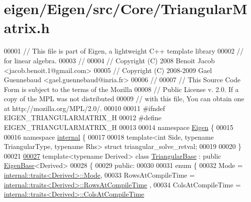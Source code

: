 \hypertarget{eigen_2_eigen_2src_2_core_2_triangular_matrix_8h_source}{}\section{eigen/\+Eigen/src/\+Core/\+Triangular\+Matrix.h}
\label{eigen_2_eigen_2src_2_core_2_triangular_matrix_8h_source}

\begin{DoxyCode}
00001 \textcolor{comment}{// This file is part of Eigen, a lightweight C++ template library}
00002 \textcolor{comment}{// for linear algebra.}
00003 \textcolor{comment}{//}
00004 \textcolor{comment}{// Copyright (C) 2008 Benoit Jacob <jacob.benoit.1@gmail.com>}
00005 \textcolor{comment}{// Copyright (C) 2008-2009 Gael Guennebaud <gael.guennebaud@inria.fr>}
00006 \textcolor{comment}{//}
00007 \textcolor{comment}{// This Source Code Form is subject to the terms of the Mozilla}
00008 \textcolor{comment}{// Public License v. 2.0. If a copy of the MPL was not distributed}
00009 \textcolor{comment}{// with this file, You can obtain one at http://mozilla.org/MPL/2.0/.}
00010 
00011 \textcolor{preprocessor}{#ifndef EIGEN\_TRIANGULARMATRIX\_H}
00012 \textcolor{preprocessor}{#define EIGEN\_TRIANGULARMATRIX\_H}
00013 
00014 \textcolor{keyword}{namespace }\hyperlink{namespace_eigen}{Eigen} \{ 
00015 
00016 \textcolor{keyword}{namespace }\hyperlink{namespaceinternal}{internal} \{
00017   
00018 \textcolor{keyword}{template}<\textcolor{keywordtype}{int} S\textcolor{keywordtype}{id}e, \textcolor{keyword}{typename} TriangularType, \textcolor{keyword}{typename} Rhs> \textcolor{keyword}{struct }triangular\_solve\_retval;
00019   
00020 \}
00021 
\hyperlink{group___core___module}{00027} \textcolor{keyword}{template}<\textcolor{keyword}{typename} Derived> \textcolor{keyword}{class }\hyperlink{group___core___module_class_eigen_1_1_triangular_base}{TriangularBase} : \textcolor{keyword}{public} \hyperlink{group___core___module_struct_eigen_1_1_eigen_base}{EigenBase}<Derived>
00028 \{
00029   \textcolor{keyword}{public}:
00030 
00031     \textcolor{keyword}{enum} \{
00032       Mode = \hyperlink{struct_eigen_1_1internal_1_1traits}{internal::traits<Derived>::Mode},
00033       RowsAtCompileTime = \hyperlink{struct_eigen_1_1internal_1_1traits}{internal::traits<Derived>::RowsAtCompileTime}
      ,
00034       ColsAtCompileTime = \hyperlink{struct_eigen_1_1internal_1_1traits}{internal::traits<Derived>::ColsAtCompileTime}

\end{DoxyCode}
